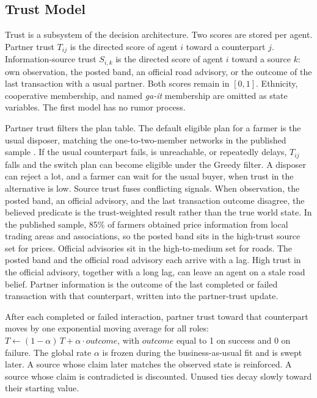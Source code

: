\documentclass{icsthesis}
\begin{document}
\begin{mainmatter}
		\subsection{Trust Model}

			Trust is a subsystem of the decision architecture. Two scores are stored per agent. Partner trust \(T_{ij}\) is the directed score of agent \(i\) toward a counterpart \(j\). Information-source trust \(S_{i,k}\) is the directed score of agent \(i\) toward a source \(k\): own observation, the posted band, an official road advisory, or the outcome of the last transaction with a usual partner. Both scores remain in \([0,1]\). Ethnicity, cooperative membership, and named \emph{ga-it} membership are omitted as state variables. The first model has no rumor process.

			Partner trust filters the plan table. The default eligible plan for a farmer is the usual disposer, matching the one-to-two-member networks in the published sample \citep{deGuzmanBambicoBaconguis2023}. If the usual counterpart fails, is unreachable, or repeatedly delays, \(T_{ij}\) falls and the switch plan can become eligible under the Greedy filter. A disposer can reject a lot, and a farmer can wait for the usual buyer, when trust in the alternative is low. Source trust fuses conflicting signals. When observation, the posted band, an official advisory, and the last transaction outcome disagree, the believed predicate is the trust-weighted result rather than the true world state. In the published sample, 85\% of farmers obtained price information from local trading areas and associations, so the posted band sits in the high-trust source set for prices. Official advisories sit in the high-to-medium set for roads. The posted band and the official road advisory each arrive with a lag. High trust in the official advisory, together with a long lag, can leave an agent on a stale road belief. Partner information is the outcome of the last completed or failed transaction with that counterpart, written into the partner-trust update.

			After each completed or failed interaction, partner trust toward that counterpart moves by one exponential moving average for all roles: \(T \leftarrow (1-\alpha)\,T + \alpha \cdot outcome\), with \(outcome\) equal to 1 on success and 0 on failure. The global rate \(\alpha\) is frozen during the business-as-usual fit and is swept later. A source whose claim later matches the observed state is reinforced. A source whose claim is contradicted is discounted. Unused ties decay slowly toward their starting value.


\end{mainmatter}
\end{document}
